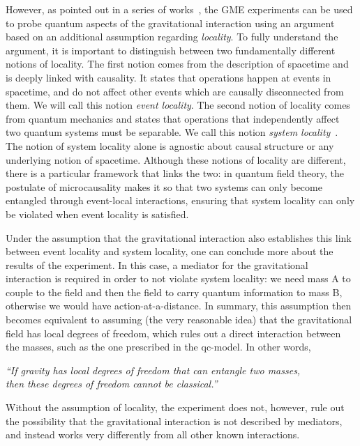 \documentclass[letterpaper,12pt,titlepage,oneside,final]{book}
\begin{document}
However, as pointed out in a series of works~\cite{B,MV,MVwhen,BMVqft}, the GME experiments can be used to probe quantum aspects of the gravitational interaction using an argument based on an additional assumption regarding \textit{locality}. To fully understand the argument, it is important to distinguish between two fundamentally different notions of locality. The first notion comes from the description of spacetime and is deeply linked with causality. It states that operations happen at events in spacetime, and do not affect other events which are causally disconnected from them. We will call this notion \textit{event locality}. The second notion of locality comes from quantum mechanics and states that operations that independently affect two quantum systems must be separable. We call this notion \textit{system locality}~\cite{ThomasFlaminiaAndJohn}. The notion of system locality alone is agnostic about causal structure or any underlying notion of spacetime. Although these notions of locality are different, there is a particular framework that links the two: in quantum field theory, the postulate of microcausality makes it so that two systems can only become entangled through event-local interactions, ensuring that system locality can only be violated when event locality is satisfied. 

Under the assumption that the gravitational interaction also establishes this link between event locality and system locality, one can conclude more about the results of the experiment. In this case, a mediator for the gravitational interaction is required in order to not violate system locality: we need mass A to couple to the field and then the field to carry quantum information to mass B, otherwise we would have action-at-a-distance. In summary, this assumption then becomes equivalent to assuming (the very reasonable idea) that the gravitational field has local degrees of freedom, which rules out a direct interaction between the masses, such as the one prescribed in the qc-model. In other words,

\begin{center}
    \textit{``If gravity has local degrees of freedom that can entangle two masses, \\then these degrees of freedom cannot be classical.''}
\end{center}

\noindent Without the assumption of locality, the experiment does not, however, rule out the possibility that the gravitational interaction is not described by mediators, and instead works very differently from all other known interactions.
\end{document}
